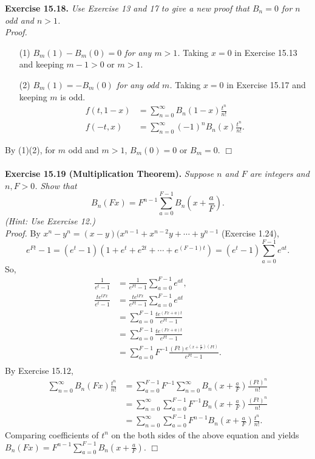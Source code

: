 \documentclass{article}
\begin{document}
\textbf{Exercise 15.18.}
\emph{Use Exercise 13 and 17 to give a new proof that
$B_n = 0$ for $n$ odd and $n > 1$.} \\

\emph{Proof.}
\begin{enumerate}
\item[(1)]
\emph{$B_m(1) - B_m(0) = 0$ for any $m > 1$.}
Taking $x = 0$ in Exercise 15.13 and keeping $m - 1 > 0$ or $m > 1$.
\item[(2)]
\emph{$B_m(1) = -B_m(0)$ for any odd $m$.}
Taking $x = 0$ in Exercise 15.17 and keeping $m$ is odd.
\begin{align*}
f(t, 1-x)
&= \sum_{n=0}^{\infty} B_n(1-x) \frac{t^n}{n!} \\
f(-t, x)
&= \sum_{n=0}^{\infty} (-1)^n B_n(x) \frac{t^n}{n!}.
\end{align*}
\end{enumerate}
By (1)(2), for $m$ odd and $m > 1$, $B_m(0) = 0$ or $B_m = 0$.
$\Box$ \\\\



\textbf{Exercise 15.19 (Multiplication Theorem).}
\emph{Suppose $n$ and $F$ are integers and $n, F > 0$. Show that
$$B_n(Fx) = F^{n-1} \sum_{a=0}^{F-1} B_n \left(x + \frac{a}{F} \right).$$
(Hint: Use Exercise 12.)} \\

\emph{Proof.}
By $x^n - y^n = (x - y)(x^{n-1} + x^{n-2}y + \cdots + y^{n-1}$ (Exercise 1.24),
$$e^{Ft} - 1
= (e^t - 1)(1 + e^t + e^{2t} + \cdots + e^{(F-1)t})
= (e^t - 1) \sum_{a=0}^{F-1} e^{at}.$$
So,
\begin{align*}
\frac{1}{e^t - 1}
&= \frac{1}{e^{Ft} - 1} \sum_{a=0}^{F-1} e^{at}, \\
\frac{te^{tFx}}{e^t - 1}
&= \frac{te^{tFx}}{e^{Ft} - 1} \sum_{a=0}^{F-1} e^{at} \\
&= \sum_{a=0}^{F-1} \frac{te^{(Fx+a)t}}{e^{Ft} - 1} \\
&= \sum_{a=0}^{F-1} \frac{te^{(Fx+a)t}}{e^{Ft} - 1} \\
&= \sum_{a=0}^{F-1} F^{-1} \frac{(Ft) e^{(x + \frac{a}{F})(Ft)}}{e^{Ft} - 1}. \\
\end{align*}
By Exercise 15.12,
\begin{align*}
\sum_{n=0}^{\infty} B_n(Fx) \frac{t^n}{n!}
&= \sum_{a=0}^{F-1} F^{-1}
\sum_{n=0}^{\infty} B_n \left( x + \frac{a}{F} \right) \frac{(Ft)^n}{n!} \\
&= \sum_{n=0}^{\infty} \sum_{a=0}^{F-1} F^{-1}
B_n \left( x + \frac{a}{F} \right) \frac{(Ft)^n}{n!} \\
&= \sum_{n=0}^{\infty} \sum_{a=0}^{F-1} F^{n-1}
B_n \left( x + \frac{a}{F} \right) \frac{t^n}{n!}.
\end{align*}
Comparing coefficients of $t^n$ on the both sides of the above equation
and yields
$B_n(Fx) = F^{n-1} \sum_{a=0}^{F-1} B_n \left(x + \frac{a}{F} \right)$.
$\Box$ \\\\
\end{document}
